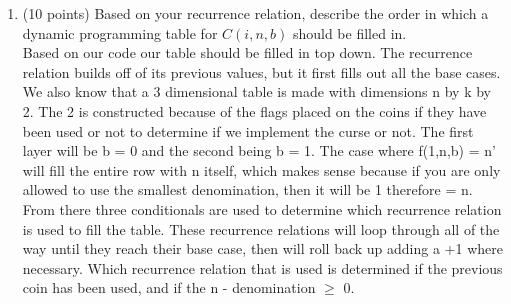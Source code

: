 \documentclass[12pt]{article}
\begin{document}
\begin{enumerate}
\begin{enumerate}
\pagebreak
	
\item \label{3b} (10 points) Based on your recurrence relation, describe the order in
    which a dynamic programming table for $C(i,n,b)$ should be filled in.\\
    
    Based on our code our table should be filled in top down. The recurrence relation builds off of its previous values, but it first fills out all the base cases. We also know that a 3 dimensional table is made with dimensions n by k by 2. The 2 is constructed because of the flags placed on the coins if they have been used or not to determine if we implement the curse or not. The first layer will be b = 0 and the second being b = 1. The case where f(1,n,b) = n' will fill the entire row with n itself, which makes sense because if you are only allowed to use the smallest denomination, then it will be 1 therefore = n.  From there three conditionals are used to determine which recurrence relation is used to fill the table. These recurrence relations will loop through all of the way until they reach their base case, then will roll back up adding a +1 where necessary. Which recurrence relation that is used is determined if the previous coin has been used, and if the n - denomination  $\geq $ 0.   
    
\pagebreak
	

\end{enumerate}
\end{enumerate}
\end{document}
